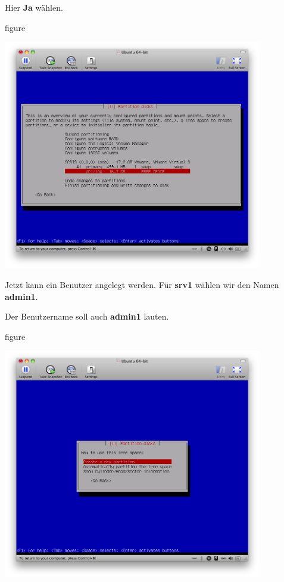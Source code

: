 Hier \textbf{Ja} wählen.

\begin{nofloat}{figure}
\begin{center}
\includegraphics[width=0.85\textwidth]{screenshots/21_ubuntu_install.png}
\end{center}
\end{nofloat}

\pagebreak
Jetzt kann ein Benutzer angelegt werden. Für \textbf{srv1} wählen wir den Namen \textbf{admin1}.

Der Benutzername soll auch \textbf{admin1} lauten.

\begin{nofloat}{figure}
\begin{center}
\includegraphics[width=0.85\textwidth]{screenshots/22_ubuntu_install.png}
\end{center}
\end{nofloat}

